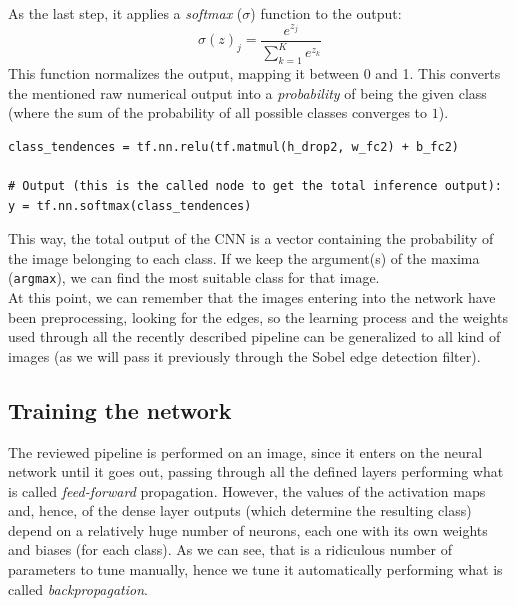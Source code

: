 \begin{enumerate}
			As the last step, it applies a \textit{softmax} ($\sigma$) function to the output:
			\begin{equation}
				\sigma(z)_j = \frac{e^{z_j}}{\sum_{k=1}^{K}e^{z_k}}
			\end{equation}
			This function normalizes the output, mapping it between 0 and 1. This converts the mentioned raw numerical output into a \emph{probability} of being the given class (where the sum of the probability of all possible classes converges to $1$).
			
			\begin{lstlisting}
class_tendences = tf.nn.relu(tf.matmul(h_drop2, w_fc2) + b_fc2)

# Output (this is the called node to get the total inference output):
y = tf.nn.softmax(class_tendences)
			\end{lstlisting}
			
		\end{enumerate}
		
		This way, the total output of the CNN is a vector containing the probability of the image belonging to each class. If we keep the argument(s) of the maxima (\texttt{argmax}), we can find the most suitable class for that image.\\
		
		At this point, we can remember that the images entering into the network have been preprocessing, looking for the edges, so the learning process and the weights used through all the recently described pipeline can be generalized to all kind of images (as we will pass it previously through the Sobel edge detection filter).\\
			

		\subsection{Training the network}
			The reviewed pipeline is performed on an image, since it enters on the neural network until it goes out, passing through all the defined layers performing what is called \emph{feed-forward} propagation. However, the values of the activation maps and, hence, of the dense layer outputs (which determine the resulting class) depend on a relatively huge number of neurons, each one with its own weights and biases (for each class). As we can see, that is a ridiculous number of parameters to tune manually, hence we tune it automatically performing what is called \emph{backpropagation}.\\
			
